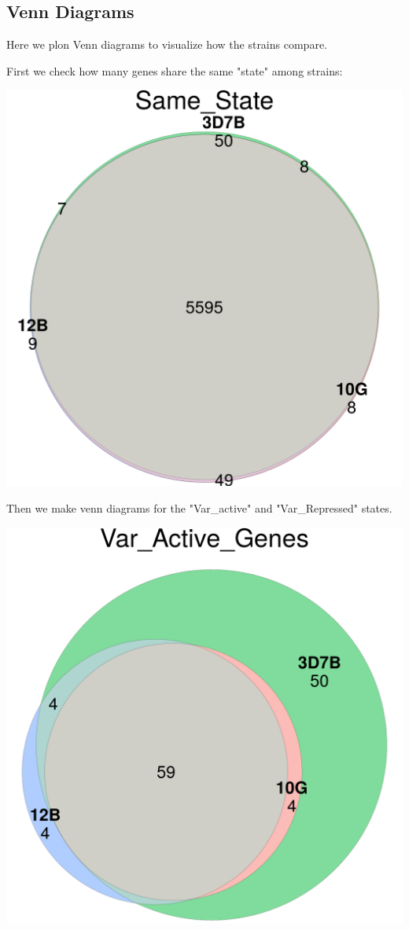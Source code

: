 \documentclass[11pt]{article}
\begin{document}
\subsection{Venn Diagrams}
\label{sec:orga76f57f}
Here we plon Venn diagrams to visualize how the strains compare.

First we check how many genes share the same "state" among strains:

\begin{center}
\includegraphics[width=.9\linewidth]{./Plots/venn_Same_State.png}
\end{center}

Then we make venn diagrams for the "Var\_active" and "Var\_Repressed" states.

\begin{center}
\includegraphics[width=.9\linewidth]{./Plots/venn_Var_Active_Genes.png}
\end{center}
\end{document}
